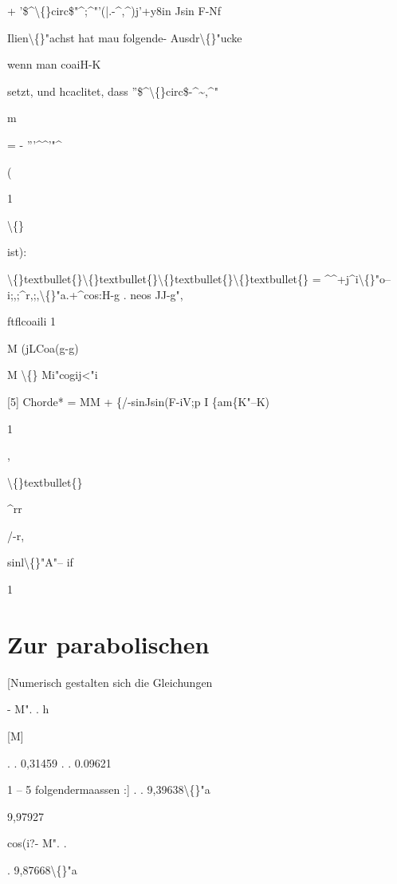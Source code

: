 \documentclass[10pt,a4paper]{article}
\begin{document}
+ '\$\textasciicircum{}\textbackslash\{\}circ\$"\textasciicircum{};\textasciicircum{}"'(|.-\textasciicircum{},\textasciicircum{})j'+y8in Jsin F-Nf

Ilien\textbackslash\{\}"achst hat mau folgende- Ausdr\textbackslash\{\}"ucke

wenn man
coaiH-K

setzt, und hcaclitet, dass ''\$\textasciicircum{}\textbackslash\{\}circ\$-\textasciicircum{}\textasciitilde{},\textasciicircum{}"

m

= - '''\textasciicircum{}\textasciicircum{}'"\textasciicircum{}

(

1

\textbackslash\{\}

ist):

\textbackslash\{\}textbullet\{\}\textbackslash\{\}textbullet\{\}\textbackslash\{\}textbullet\{\}\textbackslash\{\}textbullet\{\} = \textasciicircum{}\textasciicircum{}+j\textasciicircum{}i\textbackslash\{\}"o--i;,;\textasciicircum{}r,;,\textbackslash\{\}"a.+\textasciicircum{}cos:H-g
. neos JJ-g",

ftflcoaili 1

M
(jLCoa(g-g)

M
\textbackslash\{\}
Mi"cogij<"i

[5] Chorde* = MM + \{/-sinJsin(F-iV;p
I \{am\{K"--K)

1

,

\textbackslash\{\}textbullet\{\}

\textasciicircum{}rr

/-r,

sinl\textbackslash\{\}"A"-- if

1

\newpage
\section*{Zur parabolischen}

[Numerisch gestalten sich die Gleichungen

- M". .
h

[M]

. . 0,31459
. . 0.09621

1 -- 5 folgendermaassen :]
. . 9,39638\textbackslash\{\}"a

9,97927

cos(i?- M". .

. 9,87668\textbackslash\{\}"a
\end{document}
